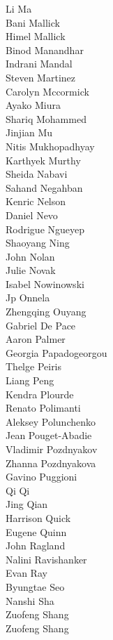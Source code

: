 Li Ma\\
Bani Mallick\\
Himel Mallick\\
Binod Manandhar\\
Indrani Mandal\\
Steven  Martinez\\
Carolyn Mccormick\\
Ayako Miura\\
Shariq Mohammed\\
Jinjian Mu\\
Nitis Mukhopadhyay\\
Karthyek Murthy\\
Sheida Nabavi\\
Sahand Negahban\\
Kenric Nelson\\
Daniel Nevo\\
Rodrigue Ngueyep\\
Shaoyang Ning\\
John Nolan\\
Julie Novak\\
Isabel Nowinowski\\
Jp Onnela\\
Zhengqing Ouyang\\
Gabriel De Pace\\
Aaron Palmer\\
Georgia Papadogeorgou\\
Thelge Peiris\\
Liang Peng\\
Kendra Plourde\\
Renato Polimanti\\
Aleksey Polunchenko\\
Jean Pouget-Abadie\\
Vladimir Pozdnyakov\\
Zhanna Pozdnyakova\\
Gavino Puggioni\\
Qi Qi\\
Jing Qian\\
Harrison  Quick\\
Eugene Quinn\\
John Ragland\\
Nalini Ravishanker\\
Evan Ray\\
Byungtae Seo\\
Nanshi Sha\\
Zuofeng Shang\\
Zuofeng Shang\\
